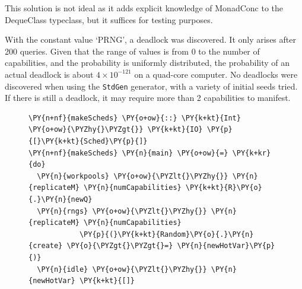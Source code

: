This solution is not ideal as it adds explicit knowledge of MonadConc
to the DequeClass typeclass, but it suffices for testing purposes.

With the constant value `PRNG', a deadlock was discovered. It only
arises after 200 queries. Given that the range of values is from 0 to
the number of capabilities, and the probability is uniformly
distributed, the probability of an actual deadlock is about $4 \times
10^{-121}$ on a quad-core computer. No deadlocks were discovered when
using the \texttt{StdGen} generator, with a variety of initial seeds
tried. If there is still a deadlock, it may require more than 2
capabilities to manifest.

\captionsetup[figure]{format=normal}
\begin{figure}[t]
  \centering
  \begin{minipage}[t]{0.49\textwidth}



\begin{Verbatim}[commandchars=\\\{\}]
\PY{n+nf}{makeScheds} \PY{o+ow}{::} \PY{k+kt}{Int} \PY{o+ow}{\PYZhy{}\PYZgt{}} \PY{k+kt}{IO} \PY{p}{[}\PY{k+kt}{Sched}\PY{p}{]}
\PY{n+nf}{makeScheds} \PY{n}{main} \PY{o+ow}{=} \PY{k+kr}{do}
  \PY{n}{workpools} \PY{o+ow}{\PYZlt{}\PYZhy{}} \PY{n}{replicateM} \PY{n}{numCapabilities} \PY{k+kt}{R}\PY{o}{.}\PY{n}{newQ}
  \PY{n}{rngs} \PY{o+ow}{\PYZlt{}\PYZhy{}} \PY{n}{replicateM} \PY{n}{numCapabilities}
            \PY{p}{(}\PY{k+kt}{Random}\PY{o}{.}\PY{n}{create} \PY{o}{\PYZgt{}\PYZgt{}=} \PY{n}{newHotVar}\PY{p}{)}
  \PY{n}{idle} \PY{o+ow}{\PYZlt{}\PYZhy{}} \PY{n}{newHotVar} \PY{k+kt}{[]}


\end{Verbatim}
\end{minipage}
\end{figure}
